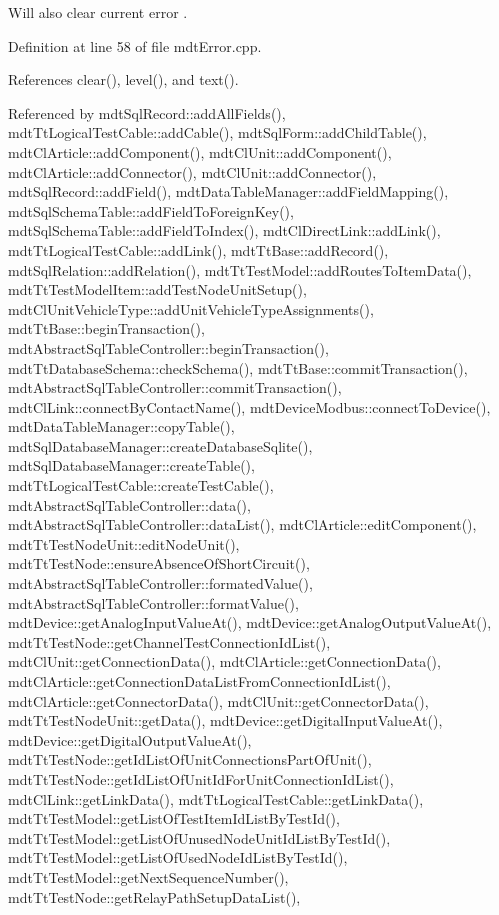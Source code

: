 Will also clear current error . 

Definition at line 58 of file mdt\-Error.\-cpp.



References clear(), level(), and text().



Referenced by mdt\-Sql\-Record\-::add\-All\-Fields(), mdt\-Tt\-Logical\-Test\-Cable\-::add\-Cable(), mdt\-Sql\-Form\-::add\-Child\-Table(), mdt\-Cl\-Article\-::add\-Component(), mdt\-Cl\-Unit\-::add\-Component(), mdt\-Cl\-Article\-::add\-Connector(), mdt\-Cl\-Unit\-::add\-Connector(), mdt\-Sql\-Record\-::add\-Field(), mdt\-Data\-Table\-Manager\-::add\-Field\-Mapping(), mdt\-Sql\-Schema\-Table\-::add\-Field\-To\-Foreign\-Key(), mdt\-Sql\-Schema\-Table\-::add\-Field\-To\-Index(), mdt\-Cl\-Direct\-Link\-::add\-Link(), mdt\-Tt\-Logical\-Test\-Cable\-::add\-Link(), mdt\-Tt\-Base\-::add\-Record(), mdt\-Sql\-Relation\-::add\-Relation(), mdt\-Tt\-Test\-Model\-::add\-Routes\-To\-Item\-Data(), mdt\-Tt\-Test\-Model\-Item\-::add\-Test\-Node\-Unit\-Setup(), mdt\-Cl\-Unit\-Vehicle\-Type\-::add\-Unit\-Vehicle\-Type\-Assignments(), mdt\-Tt\-Base\-::begin\-Transaction(), mdt\-Abstract\-Sql\-Table\-Controller\-::begin\-Transaction(), mdt\-Tt\-Database\-Schema\-::check\-Schema(), mdt\-Tt\-Base\-::commit\-Transaction(), mdt\-Abstract\-Sql\-Table\-Controller\-::commit\-Transaction(), mdt\-Cl\-Link\-::connect\-By\-Contact\-Name(), mdt\-Device\-Modbus\-::connect\-To\-Device(), mdt\-Data\-Table\-Manager\-::copy\-Table(), mdt\-Sql\-Database\-Manager\-::create\-Database\-Sqlite(), mdt\-Sql\-Database\-Manager\-::create\-Table(), mdt\-Tt\-Logical\-Test\-Cable\-::create\-Test\-Cable(), mdt\-Abstract\-Sql\-Table\-Controller\-::data(), mdt\-Abstract\-Sql\-Table\-Controller\-::data\-List(), mdt\-Cl\-Article\-::edit\-Component(), mdt\-Tt\-Test\-Node\-Unit\-::edit\-Node\-Unit(), mdt\-Tt\-Test\-Node\-::ensure\-Absence\-Of\-Short\-Circuit(), mdt\-Abstract\-Sql\-Table\-Controller\-::formated\-Value(), mdt\-Abstract\-Sql\-Table\-Controller\-::format\-Value(), mdt\-Device\-::get\-Analog\-Input\-Value\-At(), mdt\-Device\-::get\-Analog\-Output\-Value\-At(), mdt\-Tt\-Test\-Node\-::get\-Channel\-Test\-Connection\-Id\-List(), mdt\-Cl\-Unit\-::get\-Connection\-Data(), mdt\-Cl\-Article\-::get\-Connection\-Data(), mdt\-Cl\-Article\-::get\-Connection\-Data\-List\-From\-Connection\-Id\-List(), mdt\-Cl\-Article\-::get\-Connector\-Data(), mdt\-Cl\-Unit\-::get\-Connector\-Data(), mdt\-Tt\-Test\-Node\-Unit\-::get\-Data(), mdt\-Device\-::get\-Digital\-Input\-Value\-At(), mdt\-Device\-::get\-Digital\-Output\-Value\-At(), mdt\-Tt\-Test\-Node\-::get\-Id\-List\-Of\-Unit\-Connections\-Part\-Of\-Unit(), mdt\-Tt\-Test\-Node\-::get\-Id\-List\-Of\-Unit\-Id\-For\-Unit\-Connection\-Id\-List(), mdt\-Cl\-Link\-::get\-Link\-Data(), mdt\-Tt\-Logical\-Test\-Cable\-::get\-Link\-Data(), mdt\-Tt\-Test\-Model\-::get\-List\-Of\-Test\-Item\-Id\-List\-By\-Test\-Id(), mdt\-Tt\-Test\-Model\-::get\-List\-Of\-Unused\-Node\-Unit\-Id\-List\-By\-Test\-Id(), mdt\-Tt\-Test\-Model\-::get\-List\-Of\-Used\-Node\-Id\-List\-By\-Test\-Id(), mdt\-Tt\-Test\-Model\-::get\-Next\-Sequence\-Number(), mdt\-Tt\-Test\-Node\-::get\-Relay\-Path\-Setup\-Data\-List(), 